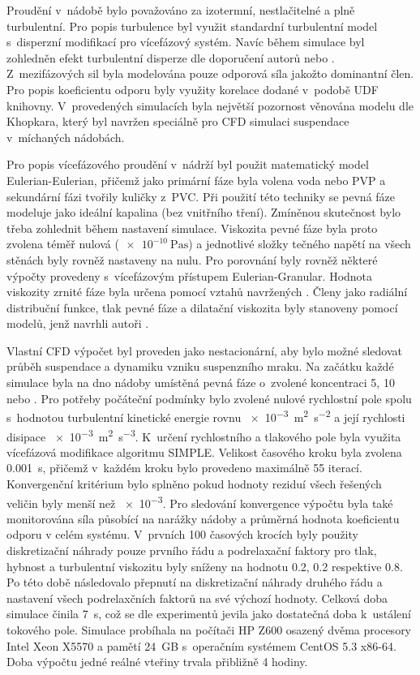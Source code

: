 Proudění v~nádobě bylo považováno za izotermní, nestlačitelné a plně turbulentní. Pro popis turbulence byl využit standardní \keps{} turbulentní model s~disperzní modifikací pro vícefázový systém. Navíc během simulace byl zohledněn efekt turbulentní disperze dle doporučení autorů \citet{lju01} nebo \citet{tamb09}. Z~mezifázových sil byla modelována pouze odporová síla jakožto dominantní člen. Pro popis koeficientu odporu byly využity korelace dodané v~podobě UDF knihovny. V~provedených simulacích byla největší pozornost věnována modelu dle Khopkara, který byl navržen speciálně pro CFD simulaci suspendace v~míchaných nádobách.

Pro popis vícefázového proudění v~nádrží byl použit 
matematický model Eulerian-Eulerian, přičemž jako primární fáze 
byla volena voda nebo PVP a sekundární fázi tvořily kuličky z~PVC. 
Při použití této techniky se pevná fáze modeluje jako ideální 
kapalina (bez vnitřního tření). Zmíněnou skutečnost bylo třeba 
zohlednit během nastavení simulace. Viskozita pevné fáze byla proto zvolena téměř nulová ($\SI{e-10}{\pascal\second}$) a jednotlivé složky tečného napětí na všech stěnách byly rovněž nastaveny na nulu. Pro porovnání byly rovněž některé výpočty provedeny s~vícefázovým přístupem Eulerian-Granular. Hodnota viskozity zrnité fáze byla určena pomocí vztahů navržených \citet{syam93}. Členy jako radiální distribuční funkce, tlak pevné fáze a dilatační viskozita byly stanoveny pomocí modelů, jenž navrhli autoři \citet{lun84}.  

Vlastní CFD výpočet byl proveden jako nestacionární, aby bylo možné sledovat průběh suspendace a dynamiku vzniku suspenzního mraku. Na začátku každé simulace byla na dno nádoby umístěná pevná fáze o~zvolené koncentraci 5, 10 nebo . Pro potřeby počáteční podmínky bylo zvolené nulové rychlostní pole spolu s~hodnotou turbulentní kinetické energie rovnu \SI{e-3}{\meter\squared\per\second\squared} a její rychlosti disipace \SI{e-3}{\meter\squared\per\second\cubed}. K~určení rychlostního a tlakového pole byla využita vícefázová modifikace algoritmu SIMPLE. Velikost časového kroku byla zvolena \SI{0.001}{\second}, přičemž v~každém kroku bylo provedeno maximálně \num{55} iterací. Konvergenční kritérium bylo splněno pokud hodnoty reziduí všech řešených veličin byly menší než \num{e-3}. Pro sledování konvergence výpočtu byla také monitorována síla působící na narážky nádoby a průměrná hodnota koeficientu odporu v celém systému. V~prvních \num{100} časových krocích byly použity diskretizační náhrady pouze prvního řádu a podrelaxační faktory pro tlak, hybnost a turbulentní viskozitu byly sníženy na hodnotu \num{0.2}, \num{0.2} respektive \num{0.8}. Po této době následovalo přepnutí na diskretizační náhrady druhého řádu a nastavení všech podrelaxčních faktorů na své výchozí hodnoty. Celková doba simulace činila \SI{7}{\second}, což se dle experimentů jevila jako dostatečná doba k~ustálení tokového pole. Simulace probíhala na počítači HP Z600 osazený dvěma procesory Intel Xeon X5570 a pamětí 24~GB s~operačním systémem CentOS 5.3 x86-64. Doba výpočtu jedné reálné vteřiny trvala přibližně 4 hodiny.

